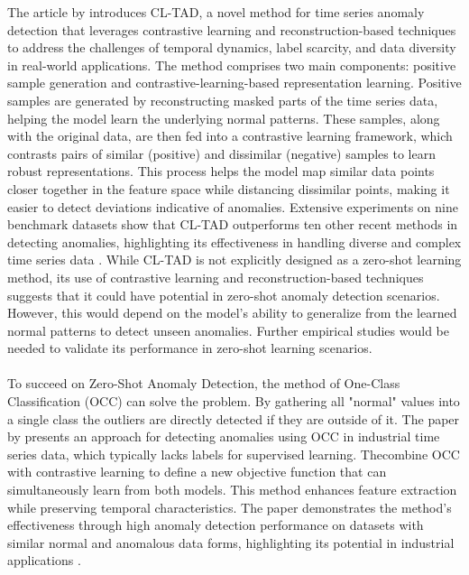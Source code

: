 The article by  introduces CL-TAD, a novel method for time series anomaly detection that leverages contrastive learning and reconstruction-based techniques to address the challenges of temporal dynamics, label scarcity, and data diversity in real-world applications. The method comprises two main components: positive sample generation and contrastive-learning-based representation learning. Positive samples are generated by reconstructing masked parts of the time series data, helping the model learn the underlying normal patterns. These samples, along with the original data, are then fed into a contrastive learning framework, which contrasts pairs of similar (positive) and dissimilar (negative) samples to learn robust representations. This process helps the model map similar data points closer together in the feature space while distancing dissimilar points, making it easier to detect deviations indicative of anomalies. Extensive experiments on nine benchmark datasets show that CL-TAD outperforms ten other recent methods in detecting anomalies, highlighting its effectiveness in handling diverse and complex time series data \cite{ngu_cl-tad_2023}.
While CL-TAD is not explicitly designed as a zero-shot learning method, its use of contrastive learning and reconstruction-based techniques suggests that it could have potential in zero-shot anomaly detection scenarios. However, this would depend on the model's ability to generalize from the learned normal patterns to detect unseen anomalies. Further empirical studies would be needed to validate its performance in zero-shot learning scenarios.\\\\
To succeed on Zero-Shot Anomaly Detection, the method of One-Class Classification (OCC) can solve the problem. %
By gathering all "normal" values into a single class the outliers are directly detected if they are outside of it. The paper by  presents an approach for detecting anomalies using OCC in industrial time series data, which typically lacks labels for supervised learning. Thecombine OCC with contrastive learning to define a new objective function that can simultaneously learn from both models. This method enhances feature extraction while preserving temporal characteristics. The paper demonstrates the method's effectiveness through high anomaly detection performance on datasets with similar normal and anomalous data forms, highlighting its potential in industrial applications \cite{lee_time_2023}.
